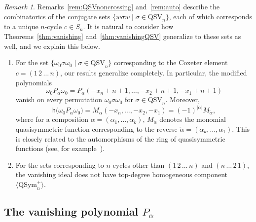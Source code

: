 \documentclass[submission]{FPSAC2024}
\theoremstyle{definition}
\theoremstyle{remark}
\newtheorem{rem}[equation]{Remark}
\numberwithin{equation}{section}
\newcommand{\QSym}{\mathrm{QSym}}
\newcommand{\QSV}{\mathrm{QSV}}
\begin{document}
\begin{rem}
Remarks~\ref{rem:QSVnoncrossing} and~\ref{rem:auto} describe the combinatorics of the conjugate sets $\{w \sigma w \;|\; \sigma \in \QSV_{n}\}$, each of which corresponds to a unique $n$-cycle $c \in S_{n}$.  
It is natural to consider how Theorems~\ref{thm:vanishing} and~\ref{thm:vanishingQSV} generalize to these sets as well, and we explain this below.
\begin{enumerate}
\item For the set $\{\omega_{0} \sigma \omega_{0} \;|\; \sigma \in \QSV_{n}\}$ corresponding to the Coxeter element $c = (1\,2\,\ldots\,n)$, our results generalize completely.  In particular, the modified polynomials
	$$\omega_0P_\alpha\omega_0=P_\alpha(-x_n+n+1,\ldots, -x_2+n+1,-x_1+n+1)$$
vanish on every permutation $\omega_{0} \sigma \omega_{0}$ for $\sigma \in \QSV_{n}$. Moreover,
 \[
 \mathsf{h}\big(\omega_0P_\alpha\omega_0\big) = M_{\alpha}(-x_n,\ldots,-x_2,-x_1)=(-1)^{|\alpha|} M_{\overleftarrow{\alpha}},
 \]
where for a composition $\alpha=(\alpha_1,\ldots,\alpha_k)$,  $M_{\overleftarrow{\alpha}}$ denotes the monomial quasisymmetric function corresponding to the reverse $\overleftarrow{\alpha}=(\alpha_k,\ldots,\alpha_1)$.  This is closely related to the automorphisms of the ring of quasisymmetric functions (see, for example~\cite{JWY}).

\item For the sets corresponding to $n$-cycles other than $(1\,2\,\ldots\,n)$ and $(n\,\ldots\,2\,1)$, the vanishing ideal does not have top-degree homogeneous component $\langle \QSym_{n}^{+} \rangle$.  

\end{enumerate}
\end{rem}





\subsection{The vanishing polynomial $P_{\alpha}$}
\label{sec:QSymvanish}
\end{document}
